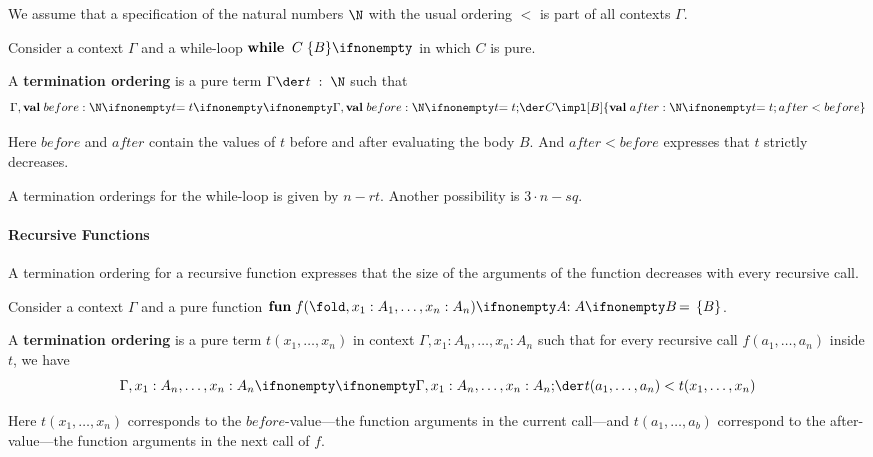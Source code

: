 We assume that a specification of the natural numbers $\N$ with the usual ordering $<$ is part of all contexts $\Gamma$.

\begin{definition}
Consider a context $\Gamma$ and a while-loop $\awhileI{C}{B}$ in which $C$ is pure.

A \textbf{termination ordering} is a pure term $\oftype{}{\Gamma}{t}{\N}$ such that
 \[\iscons{}{\Gamma,\aval{before}{\N}{t}}{}{C\impl \abox{B}{\{\aval{after}{\N}{t}; after<before\}}}\]
\end{definition}

Here $before$ and $after$ contain the values of $t$ before and after evaluating the body $B$.
And $after<before$ expresses that $t$ strictly decreases.

\begin{example}\label{ex:sd:sqrt5}
A termination orderings for the while-loop is given by $n-rt$. Another possibility is $3\cdot n-sq$.\footnotemark
\end{example}

\paragraph{Recursive Functions}

A termination ordering for a recursive function expresses that the size of the arguments of the function decreases with every recursive call.

\begin{definition}
Consider a context $\Gamma$ and a pure function $\afunI[A]{f}{x_1:A_1,\ldots,x_n:A_n}{B}$.

A \textbf{termination ordering} is a pure term $t(x_1,\ldots,x_n)$ in context $\Gamma,x_1:A_n,\ldots,x_n:A_n$ such that for every recursive call $f(a_1,\ldots,a_n)$ inside $t$, we have
 \[\iscons{}{\Gamma,x_1:A_n,\ldots,x_n:A_n}{}{t(a_1,\ldots,a_n)<t(x_1,\ldots,x_n)}\]
\end{definition}

Here $t(x_1,\ldots,x_n)$ corresponds to the $before$-value---the function arguments in the current call---and $t(a_1,\ldots,a_b)$ correspond to the after-value---the function arguments in the next call of $f$.

